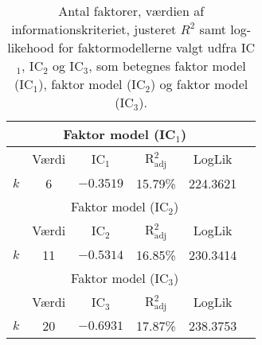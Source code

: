 
\begin{table}[h]
\center
\begin{tabular}{lccccc}
\toprule
\multicolumn{5}{c}{Faktor model (IC$_1$)} \\ \midrule
& Værdi &  IC$_1$ &  R$^2_{\text{adj}}$ & LogLik  \\
$k$ & 6 &  $-0.3519$ &  15.79\% &  224.3621  \\ \bottomrule \toprule
\multicolumn{5}{c}{Faktor model (IC$_2$)} \\ \midrule
 & Værdi &  IC$_2$ &  R$^2_{\text{adj}}$ & LogLik \\
 $k$ &11 & $-0.5314$ &  16.85\% &  230.3414 \\\bottomrule \toprule
\multicolumn{5}{c}{Faktor model (IC$_3$)} \\ \midrule
& Værdi &  IC$_3$ &  R$^2_{\text{adj}}$ & LogLik\\
$k$ & 20 & $-0.6931$ & 17.87\% & 238.3753 \\  \bottomrule
 \end{tabular}
 \caption{Antal faktorer, værdien af informationskriteriet, justeret \(R^2\) samt log-likehood for faktormodellerne valgt udfra IC$_1$, IC$_2$ og IC$_3$, som betegnes faktor model (IC\(_1\)), faktor model (IC\(_2\)) og faktor model (IC\(_3\)).} \label{tab:est_faktor}
\end{table}